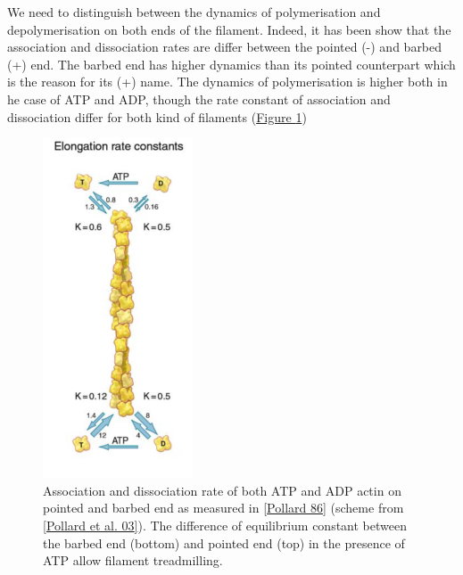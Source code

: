 \documentclass[A4paperpaper,11pt,english]{sphinxmanual}
\begin{document}
We need to distinguish between the dynamics of polymerisation and
depolymerisation on both ends of the filament. Indeed, it has been show that the
association and dissociation rates are differ between the pointed (-) and
barbed (+) end. The barbed end has  higher dynamics than its pointed
counterpart which is the reason for its (+) name. The dynamics of
polymerisation is higher both in he case of ATP and ADP, though the rate
constant of association and dissociation differ for both kind of filaments (\hyperref[parts/part1:fig-actin-pollard]{Figure  \ref*{parts/part1:fig-actin-pollard}})
\begin{figure}[htbp]
\centering
\capstart

\includegraphics[width=0.250\linewidth]{elongation-rate-constant.png}
\caption{Association and dissociation rate of both ATP and ADP actin on pointed and
barbed end as measured in {\hyperref[parts/part1:pollard1986]{{[}Pollard 86{]}}} (scheme from {\hyperref[parts/part1:pollard2003]{{[}Pollard et al. 03{]}}}).
The difference of equilibrium constant between the barbed end (bottom)
and pointed end (top) in the presence of ATP allow filament treadmilling.}\label{parts/part1:fig-actin-pollard}\end{figure}
\end{document}
